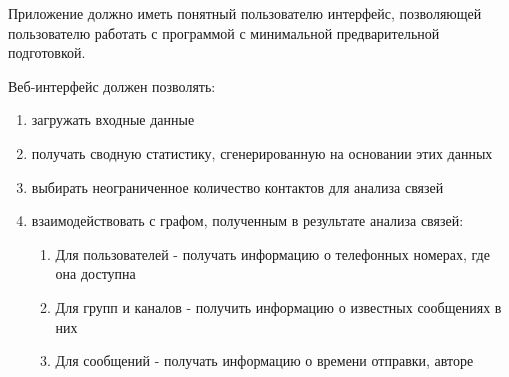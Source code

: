 Приложение должно иметь понятный пользователю интерфейс, позволяющей пользователю работать с программой с минимальной предварительной подготовкой. 

Веб-интерфейс должен позволять:
\begin{enumerate}
    \item загружать входные данные
    \item получать сводную статистику, сгенерированную на основании этих данных
    \item выбирать неограниченное количество контактов для анализа связей
    \item взаимодействовать с графом, полученным в результате анализа связей:
    \begin{enumerate}
        \item Для пользователей - получать информацию о телефонных номерах, где она доступна
        \item Для групп и каналов - получить информацию о известных сообщениях в них
        \item Для сообщений - получать информацию о времени отправки, авторе
    \end{enumerate}
\end{enumerate}
